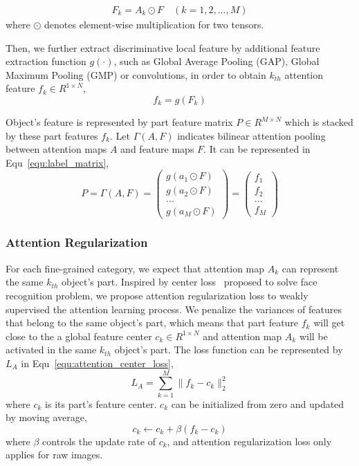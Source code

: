 \documentclass[10pt,twocolumn,letterpaper]{article}
\begin{document}
\begin{equation}
\begin{aligned}
F_k = A_k \odot F \quad(k = 1,2,...,M)
\end{aligned}
\label{equ:attention_pooling}
\end{equation}
where $\odot$ denotes element-wise multiplication for two tensors.

Then, we further extract discriminative local feature by additional feature extraction function $g(\cdot)$, such as Global Average Pooling (GAP), Global Maximum Pooling (GMP) or convolutions, in order to obtain $k_{th}$ attention feature $f_k\in R^{1 \times N}$,
\begin{equation}
f_k = g(F_k)
\end{equation}

Object's feature is represented by part feature matrix $P \in R^{M \times N} $ which is stacked by these part features $f_k$. Let $\Gamma(A, F)$ indicates bilinear attention pooling between attention maps $A$ and feature maps $F$. It can be represented in Equ~\ref{equ:label_matrix},
\begin{equation}
P= \Gamma(A, F)
= \begin{pmatrix} g (a_1 \odot F) \\ g(a_2 \odot F) \\ ... \\ g(a_M \odot F)  \end{pmatrix}
= \begin{pmatrix}f_1 \\ f_2 \\ ... \\ f_M \end{pmatrix}
\label{equ:label_matrix}
\end{equation}

\subsubsection{Attention Regularization}
For each fine-grained category, we expect that attention map $A_k$ can represent the same $k_{th}$ object's part.
Inspired by center loss~\cite{center_loss} proposed to solve face recognition problem, we propose attention regularization loss to weakly supervised the attention learning process. We penalize the variances of features that belong to the same object's part, which means that part feature $f_k$ will get close to the a global feature center $c_k\in R^{1 \times N}$ and attention map $A_k$ will be activated in the same $k_{th}$ object's part. The loss function can be represented by $L_A$ in Equ~\ref{equ:attention_center_loss},
\begin{equation}
L_{A} = \sum_{k=1}^M \| f_k - c_k \|_2^2
\label{equ:attention_center_loss}
\end{equation}
where $c_k$ is its part's feature center.  $c_k$ can be initialized from zero and updated by moving average,
\begin{equation}
c_k \gets c_k + \beta (f_k - c_k)
\end{equation}
where $\beta$ controls the update rate of $c_k$, and attention regularization loss only applies for raw images.
\end{document}
